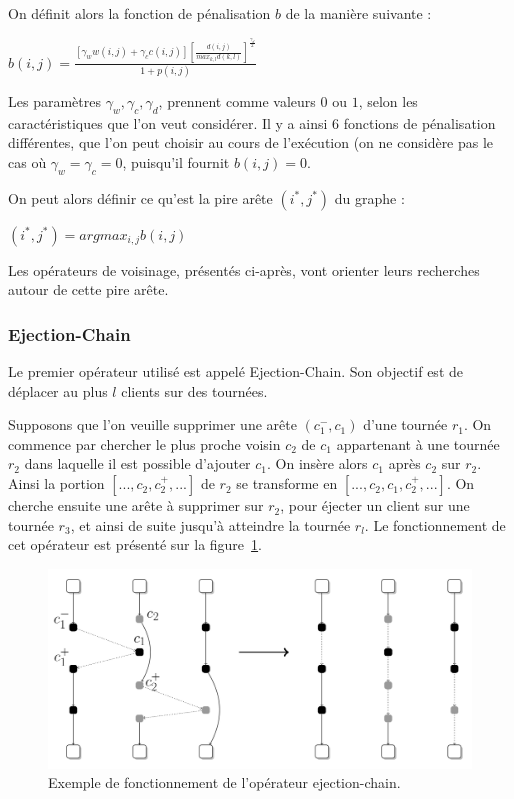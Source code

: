 \documentclass[a4paper,11pt]{article}%
\begin{document}
On définit alors la fonction de pénalisation $b$ de la manière suivante :
\begin{center}
$b(i,j) = \frac{[\gamma_w w(i,j) + \gamma_c c(i,j)] [\frac{d(i,j)}{max_{k,l}d(k,l)}] ^ {\frac{\gamma_d}{2}}}{1+p(i,j)}$
\end{center}

Les paramètres $\gamma_w,\gamma_c,\gamma_d$, prennent comme valeurs $0$ ou $1$, selon les caractéristiques que l'on veut considérer. 
Il y a ainsi 6 fonctions de pénalisation différentes, que l'on peut choisir au cours de l'exécution (on ne considère pas le cas où $\gamma_w = \gamma_c = 0$, puisqu'il fournit $b(i,j) = 0$.

On peut alors définir ce qu'est la pire arête $(i^*,j^*)$ du graphe :

\begin{center}
$ (i^*,j^*) = argmax_{i,j} b(i,j)$
\end{center}

Les opérateurs de voisinage, présentés ci-après, vont orienter leurs recherches autour de cette pire arête.
 
\subsubsection{Ejection-Chain}

Le premier opérateur utilisé est appelé Ejection-Chain. Son objectif est de déplacer au plus $l$ clients sur des tournées. 

Supposons que l'on veuille supprimer une arête $(c_1^-,c_1)$ d'une tournée $r_1$.
On commence par chercher le plus proche voisin $c_2$ de $c_1$ appartenant à une tournée $r_2$ dans laquelle il est possible d'ajouter $c_1$.
On insère alors $c_1$ après $c_2$ sur $r_2$. 
Ainsi la portion $[...,c_2,c_2^+,...]$ de $r_2$ se transforme en $[...,c_2,c_1,c_2^+,...]$.
On cherche ensuite une arête à supprimer sur $r_2$, pour éjecter un client sur une tournée $r_3$, et ainsi de suite jusqu'à atteindre la tournée $r_l$.
Le fonctionnement de cet opérateur est présenté sur la figure~\ref{EC}. 

\begin{figure}
\centering
\includegraphics[scale=0.2]{ejection_chain_big.png}
\caption{Exemple de fonctionnement de l'opérateur ejection-chain.}
\label{EC}
\end{figure}
\end{document}
